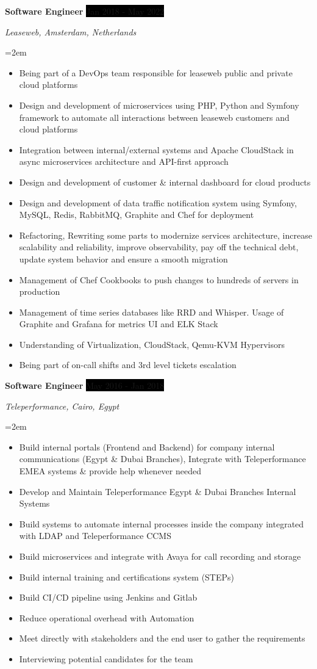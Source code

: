\documentclass[paper=a4,fontsize=11pt]{scrartcl} %
\newcommand{\sepspace}{\vspace*{1em}}		%
\newcommand{\EducationEntry}[4]{
		\noindent \textbf{#1} \hfill      %
		\colorbox{Black}{%
			\parbox{6em}{%
			\hfill\color{White}#2}} \par  %
		\noindent \textit{#3} \par        %
		\noindent\hangindent=2em\hangafter=0 \small #4 %
		\normalsize \par}
\newcommand{\WorkEntry}[4]{				  %
		\noindent \textbf{#1} \hfill      %
		\colorbox{Black}{\color{White}#2} \par  %
		\noindent \textit{#3} \par              %
		\noindent\hangindent=2em\hangafter=0 \small #4 %
		\normalsize \par}
\begin{document}
\WorkEntry{Software Engineer}{Jan 2018 - May 2022}{Leaseweb, Amsterdam, Netherlands}{\begin{itemize}
\item Being part of a DevOps team responsible for leaseweb public and private cloud platforms
\item Design and development of microservices using PHP, Python and Symfony framework to automate all interactions between leaseweb customers and cloud platforms
\item Integration between internal/external systems and Apache CloudStack in async microservices architecture and API-first approach
\item Design and development of customer \& internal dashboard for cloud products
\item Design and development of data traffic notification system using Symfony, MySQL, Redis, RabbitMQ, Graphite and Chef for deployment
\item Refactoring, Rewriting some parts to modernize services architecture, increase scalability and reliability, improve observability, pay off the technical debt, update system behavior and ensure a smooth migration
\item Management of Chef Cookbooks to push changes to hundreds of servers in production
\item Management of time series databases like RRD and Whisper. Usage of Graphite and Grafana for metrics UI and ELK Stack
\item Understanding of Virtualization, CloudStack, Qemu-KVM Hypervisors
\item Being part of on-call shifts and 3rd level tickets escalation
\end{itemize}}
\sepspace

\WorkEntry{Software Engineer}{May 2016 - Jan 2018}{Teleperformance, Cairo, Egypt}{\begin{itemize}
\item Build internal portals (Frontend and Backend) for company internal communications (Egypt \& Dubai Branches), Integrate with Teleperformance EMEA systems \& provide help whenever needed
\item Develop and Maintain Teleperformance Egypt \& Dubai Branches Internal Systems
\item Build systems to automate internal processes inside the company integrated with LDAP and Teleperformance CCMS
\item Build microservices and integrate with Avaya for call recording and storage
\item Build internal training and certifications system (STEPs)
\item Build CI/CD pipeline using Jenkins and Gitlab
\item Reduce operational overhead with Automation
\item Meet directly with stakeholders and the end user to gather the requirements
\item Interviewing potential candidates for the team
\end{itemize}}
\sepspace
\end{document}
